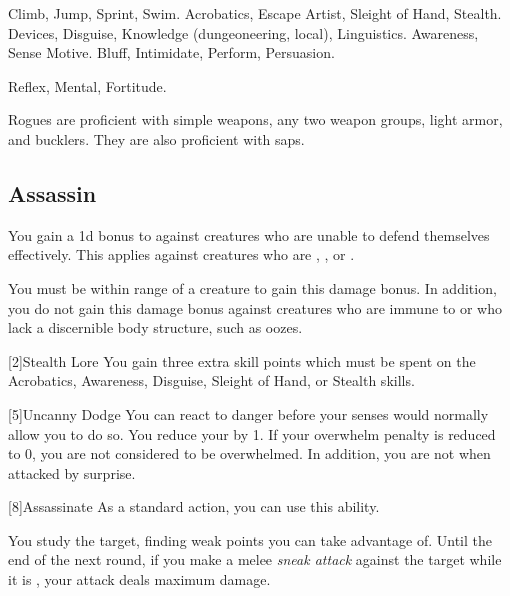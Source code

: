          Climb, Jump, Sprint, Swim.
         Acrobatics, Escape Artist, Sleight of Hand, Stealth.
         Devices, Disguise, Knowledge (dungeoneering, local), Linguistics.
         Awareness, Sense Motive.
         Bluff, Intimidate, Perform, Persuasion.

          Reflex,  Mental,  Fortitude.

        Rogues are proficient with simple weapons, any two weapon groups, light armor, and bucklers.
        They are also proficient with saps.

        \subsection{Assassin}
             You gain a \plus1d bonus to  against creatures who are unable to defend themselves effectively.
            This applies against creatures who are \unaware, , or .

            You must be within \rngclose range of a creature to gain this damage bonus.
            In addition, you do not gain this damage bonus against creatures who are immune to  or who lack a discernible body structure, such as oozes.

            [2]{Stealth Lore} You gain three extra skill points which must be spent on the Acrobatics, Awareness, Disguise, Sleight of Hand, or Stealth skills.

            [5]{Uncanny Dodge} You can react to danger before your senses would normally allow you to do so.
            You reduce your  by 1.
            If your overwhelm penalty is reduced to 0, you are not considered to be overwhelmed.
            In addition, you are not \unaware when attacked by surprise.

            [8]{Assassinate} As a standard action, you can use this ability.
            \begin{ability}
                \begin{spelltargetinginfo}
                \end{spelltargetinginfo}
                \begin{spelleffects}
                    \spelleffect You study the target, finding weak points you can take advantage of.
                    Until the end of the next round, if you make a melee \textit{sneak attack} against the target while it is \unaware, your attack deals maximum damage.
                \end{spelleffects}
            \end{ability}

